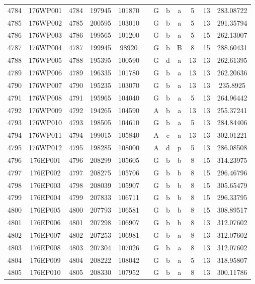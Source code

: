 \begin{tabular}{|*{12}{c|}}
4784 & 176WP001 & 4784 & 197945 & 101870 &  & G & b & a & 5 & 13 & 283.08722 \\ 
4785 & 176WP002 & 4785 & 200595 & 103010 &  & G & b & a & 5 & 13 & 291.35794 \\ 
4786 & 176WP003 & 4786 & 199565 & 101200 &  & G & b & a & 5 & 15 & 262.13007 \\ 
4787 & 176WP004 & 4787 & 199945 & 98920 &  & G & b & B & 8 & 15 & 288.60431 \\ 
4788 & 176WP005 & 4788 & 195395 & 100590 &  & G & d & a & 13 & 13 & 262.61395 \\ 
4789 & 176WP006 & 4789 & 196335 & 101780 &  & G & b & a & 13 & 13 & 262.20636 \\ 
4790 & 176WP007 & 4790 & 195235 & 103070 &  & G & b & a & 13 & 13 & 235.8925 \\ 
4791 & 176WP008 & 4791 & 195965 & 104040 &  & G & b & a & 5 & 13 & 264.96442 \\ 
4792 & 176WP009 & 4792 & 194265 & 104590 &  & A & b & a & 13 & 13 & 255.37241 \\ 
4793 & 176WP010 & 4793 & 198505 & 104610 &  & G & b & a & 5 & 13 & 284.84406 \\ 
4794 & 176WP011 & 4794 & 199015 & 105840 &  & A & c & a & 13 & 13 & 302.01221 \\ 
4795 & 176WP012 & 4795 & 198285 & 108000 &  & A & d & p & 5 & 13 & 286.08508 \\ 
4796 & 176EP001 & 4796 & 208299 & 105605 &  & G & b & b & 8 & 15 & 314.23975 \\ 
4797 & 176EP002 & 4797 & 208275 & 105706 &  & G & b & b & 8 & 15 & 296.46796 \\ 
4798 & 176EP003 & 4798 & 208039 & 105907 &  & G & b & b & 8 & 15 & 305.65479 \\ 
4799 & 176EP004 & 4799 & 207833 & 106711 &  & G & b & b & 8 & 15 & 296.33795 \\ 
4800 & 176EP005 & 4800 & 207793 & 106581 &  & G & b & b & 8 & 15 & 308.89517 \\ 
4801 & 176EP006 & 4801 & 207298 & 106907 &  & G & b & b & 8 & 13 & 312.07602 \\ 
4802 & 176EP007 & 4802 & 207253 & 106981 &  & G & b & a & 8 & 13 & 312.07602 \\ 
4803 & 176EP008 & 4803 & 207304 & 107026 &  & G & b & a & 8 & 13 & 312.07602 \\ 
4804 & 176EP009 & 4804 & 208222 & 108042 &  & G & b & a & 5 & 13 & 318.95807 \\ 
4805 & 176EP010 & 4805 & 208330 & 107952 &  & G & b & a & 8 & 13 & 300.11786 \\ 

\end{tabular}
